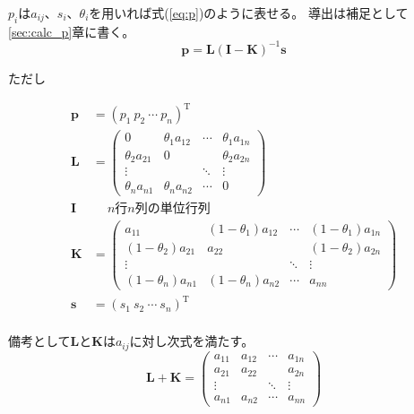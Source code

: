 \documentclass{jarticle}
\numberwithin{equation}{section}
\numberwithin{table}{section}
\theoremstyle{plain}
\begin{document}
$p_i$は$a_{i j}$、$s_i$、$\theta_i$を用いれば式(\ref{eq:p})のように表せる。
導出は補足として\ref{sec:calc_p}章に書く。
\begin{equation}
    \label{eq:p}
    \bm{p} =\bm{L}(\bm{I} - \bm{K})^{-1}\bm{s}
\end{equation}
\begin{center}
    ただし
\end{center}
\begin{align*}
    \bm{p} &= (p_1\ p_2\ \cdots\ p_n)^\mathrm{T} \\
    \bm{L} &= \begin{pmatrix}
        0                & \theta_1 a_{1 2} & \cdots & \theta_1 a_{1 n} \\
        \theta_2 a_{2 1} & 0                &        & \theta_2 a_{2 n} \\
        \vdots           &                  & \ddots & \vdots           \\
        \theta_n a_{n 1} & \theta_n a_{n 2} & \cdots & 0
    \end{pmatrix} \\
    \bm{I} & \quad \ \text{$n$行$n$列の単位行列} \\
    \bm{K} &= \begin{pmatrix}
                       a_{1 1} & (1 - \theta_1) a_{1 2} & \cdots & (1 - \theta_1) a_{1 n} \\
        (1 - \theta_2) a_{2 1} &                a_{2 2} &        & (1 - \theta_2) a_{2 n} \\
        \vdots                 &                        & \ddots & \vdots                 \\
        (1 - \theta_n) a_{n 1} & (1 - \theta_n) a_{n 2} & \cdots &                a_{n n}
    \end{pmatrix} \\
    \bm{s} &= (s_1\ s_2\ \cdots\ s_n)^\mathrm{T} \\
\end{align*}

備考として$\bm{L}$と$\bm{K}$は$a_{i j}$に対し次式を満たす。
\begin{equation}
    \label{eq:L+K=A}
    \bm{L} + \bm{K} = \begin{pmatrix}
        a_{1 1} & a_{1 2} & \cdots & a_{1 n} \\
        a_{2 1} & a_{2 2} &        & a_{2 n} \\
        \vdots  &         & \ddots & \vdots  \\
        a_{n 1} & a_{n 2} & \cdots & a_{n n}
    \end{pmatrix}
\end{equation}
\end{document}
